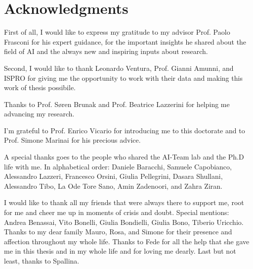 \section*{Acknowledgments}
First of all, I would like to express my gratitude to my advisor
Prof. Paolo Frasconi for his expert guidance, for the important
insights he shared about the field of AI and the always new and
inspiring inputs about research.

Second, I would like to thank Leonardo Ventura, Prof. Gianni Amunni,
and ISPRO for giving me the opportunity to work with their data and
making this work of thesis possibile.

Thanks to Prof. S{\o}ren Brunak and Prof. Beatrice Lazzerini for
helping me advancing my 
research. 

I’m grateful to Prof. Enrico Vicario for introducing me to this
doctorate and to Prof. Simone Marinai for his precious advice.

A special thanks goes to the people who shared the AI-Team lab and the
Ph.D life with me. In alphabetical order: Daniele Baracchi, Samuele
Capobianco, Alessandro Lazzeri, Francesco Orsini, Giulia Pellegrini,
Dasara Shullani,
Alessandro Tibo, La Ode Tore Sano, Amin Zadenoori, and Zahra Ziran.

I would like to thank all my friends that were always there to support
me, root for me and cheer me up in moments of crisis and
doubt. Special mentions: Andrea Benassai, Vito Bonelli, Giulia
Bondielli, Giulia Bono, Tiberio Uricchio. Thanks to my dear family
Mauro, Rosa, and Simone for their presence and affection throughout my
whole life. Thanks to Fede for all the help that she gave me in this
thesis and in my whole life and for loving me dearly. Last but not
least, thanks to Spallina.

